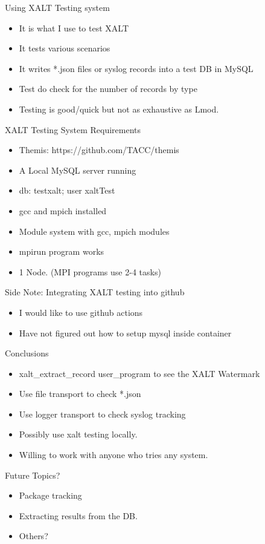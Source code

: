 \documentclass{beamer}
\begin{document}
\begin{frame}{Using XALT Testing system}
  \begin{itemize}
    \item It is what I use to test XALT
    \item It tests various scenarios
    \item It writes *.json files or syslog records into a test DB in MySQL
    \item Test do check for the number of records by type
    \item Testing is good/quick but not as exhaustive as Lmod.
  \end{itemize}
\end{frame}

\begin{frame}{XALT Testing System Requirements}
  \begin{itemize}
    \item Themis: https://github.com/TACC/themis
    \item A Local MySQL server running
    \item db: testxalt; user xaltTest
    \item gcc and mpich installed
    \item Module system with gcc, mpich modules
    \item mpirun program works
    \item 1 Node. (MPI programs use 2-4 tasks)
  \end{itemize}
\end{frame}

\begin{frame}{Side Note: Integrating XALT testing into github}
  \begin{itemize}
    \item I would like to use github actions
    \item Have not figured out how to setup mysql inside container
  \end{itemize}
\end{frame}


\begin{frame}{Conclusions}
  \begin{itemize}
    \item xalt\_extract\_record user\_program to see the XALT
      Watermark
    \item Use file transport to check *.json
    \item Use logger transport to check syslog tracking
    \item Possibly use xalt testing locally.
    \item Willing to work with anyone who tries any system.
  \end{itemize}
\end{frame}


\begin{frame}{Future Topics?} 
  \begin{itemize}
    \item Package tracking
    \item Extracting results from the DB.
    \item Others?
  \end{itemize}
\end{frame}
%

%
\end{document}

